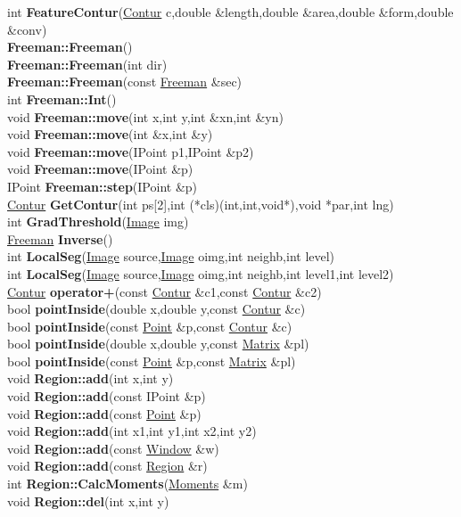 \documentclass[10pt,titlepage]{article}
\def\functionlistentry#1#2#3#4#5#6{\noindent #1 {\bf #2}(#3) \dotfill #6\\}
\begin{document}
{{\functionlistentry{int}{FeatureContur}{\hyperlink{Contur}{Contur} c,double \&length,double \&area,double \&form,double \&conv}{430}{conturs}{}
\functionlistentry{}{Freeman::Freeman}{}{464}{conturs}{}
\functionlistentry{}{Freeman::Freeman}{int dir}{465}{conturs}{}
\functionlistentry{}{Freeman::Freeman}{const \hyperlink{Freeman}{Freeman} \&sec}{466}{conturs}{}
\functionlistentry{int}{Freeman::Int}{}{467}{conturs}{}
\functionlistentry{void}{Freeman::move}{int x,int y,int \&xn,int \&yn}{468}{conturs}{}
\functionlistentry{void}{Freeman::move}{int \&x,int \&y}{469}{conturs}{}
\functionlistentry{void}{Freeman::move}{IPoint p1,IPoint \&p2}{470}{conturs}{}
\functionlistentry{void}{Freeman::move}{IPoint \&p}{471}{conturs}{}
\functionlistentry{IPoint}{Freeman::step}{IPoint \&p}{472}{conturs}{}
\functionlistentry{\hyperlink{Contur}{Contur}}{GetContur}{int ps[2],int (*cls)(int,int,void*),void *par,int lng}{442}{conturs}{}
\functionlistentry{int}{GradThreshold}{\hyperlink{Image}{Image} img}{445}{conturs}{}
\functionlistentry{\hyperlink{Freeman}{Freeman}}{Inverse}{}{473}{conturs}{}
\functionlistentry{int}{LocalSeg}{\hyperlink{Image}{Image} source,\hyperlink{Image}{Image} oimg,int neighb,int level}{443}{conturs}{}
\functionlistentry{int}{LocalSeg}{\hyperlink{Image}{Image} source,\hyperlink{Image}{Image} oimg,int neighb,int level1,int level2}{444}{conturs}{}
\functionlistentry{\hyperlink{Contur}{Contur}}{operator+}{const \hyperlink{Contur}{Contur} \&c1,const \hyperlink{Contur}{Contur} \&c2}{404}{conturs}{}
\functionlistentry{bool}{pointInside}{double x,double y,const \hyperlink{Contur}{Contur} \&c}{459}{conturs}{}
\functionlistentry{bool}{pointInside}{const \hyperlink{Point}{Point} \&p,const \hyperlink{Contur}{Contur} \&c}{460}{conturs}{}
\functionlistentry{bool}{pointInside}{double x,double y,const \hyperlink{Matrix}{Matrix} \&pl}{461}{conturs}{}
\functionlistentry{bool}{pointInside}{const \hyperlink{Point}{Point} \&p,const \hyperlink{Matrix}{Matrix} \&pl}{462}{conturs}{}
\functionlistentry{void}{Region::add}{int x,int y}{477}{conturs}{}
\functionlistentry{void}{Region::add}{const IPoint \&p}{478}{conturs}{}
\functionlistentry{void}{Region::add}{const \hyperlink{Point}{Point} \&p}{479}{conturs}{}
\functionlistentry{void}{Region::add}{int x1,int y1,int x2,int y2}{480}{conturs}{}
\functionlistentry{void}{Region::add}{const \hyperlink{Window}{Window} \&w}{481}{conturs}{}
\functionlistentry{void}{Region::add}{const \hyperlink{Region}{Region} \&r}{482}{conturs}{}
\functionlistentry{int}{Region::CalcMoments}{\hyperlink{Moments}{Moments} \&m}{494}{conturs}{}
\functionlistentry{void}{Region::del}{int x,int y}{485}{conturs}{}
}}
\end{document}
